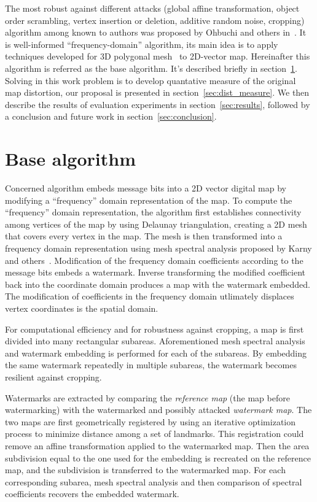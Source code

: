 \documentclass{article}
\begin{document}
The most robust against different attacks (global affine transformation, object order scrambling, vertex insertion or deletion, additive random noise, cropping) algorithm among known to authors 
was proposed by Ohbuchi and others in~\cite{Ohbuchi}. It is well-informed ``frequency-domain'' algorithm, its main idea is to apply techniques developed for 3D polygonal mesh~\cite{Ohbuchi3D} to 2D-vector map. 
Hereinafter this algorithm is referred as the base algorithm. It's described briefly in section~\ref{sec:base}. Solving in this work problem is to develop quantative measure of the original map distortion, 
our proposal is presented in section~\ref{sec:dist_measure}. We then describe the results of evaluation experiments in section~\ref{sec:results}, 
followed by a conclusion and future work in section~\ref{sec:conclusion}.

\section{Base algorithm}
\label{sec:base}
Concerned algorithm embeds message bits into a 2D vector digital map by modifying a ``frequency'' domain representation of the map. 
To compute the ``frequency'' domain representation, the algorithm first establishes connectivity among vertices of the map by using Delaunay triangulation, creating a 2D mesh that covers every vertex in the map.
The mesh is then transformed into a frequency domain representation using mesh spectral analysis proposed by Karny and others~\cite{Karni1, Karni2}. Modification of the frequency domain coefficients 
according to the message bits embeds a watermark. Inverse transforming the modified coefficient back into the coordinate domain produces a map with the watermark embedded. The modification of coefficients in the
frequency domain utlimately displaces vertex coordinates is the spatial domain.

For computational efficiency and for robustness against cropping, a map is first divided into many rectangular subareas. Aforementioned mesh spectral analysis and watermark embedding is performed 
for each of the subareas. By embedding the same watermark repeatedly in multiple subareas, the watermark becomes resilient against cropping.

Watermarks are extracted by comparing the \textit{reference map} (the map before watermarking) with the watermarked and possibly attacked \textit{watermark map}. The two maps are first geometrically registered by
using an iterative optimization process to minimize distance among a set of landmarks. This registration could remove an affine transformation applied to the watermarked map. Then the area subdivision 
equal to the one used for the embedding is recreated on the reference map, and the subdivision is transferred to the watermarked map. For each corresponding subarea, mesh spectral analysis and then comparison of
spectral coefficients recovers the embedded watermark.
\end{document}
